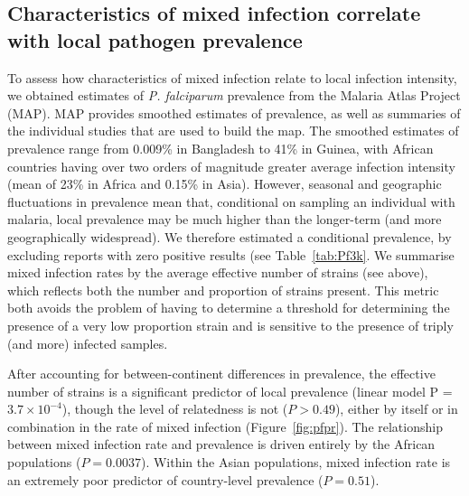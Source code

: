 \documentclass[9pt,lineno]{elife}
\begin{document}
\subsection{Characteristics of mixed infection correlate with local pathogen prevalence}


To assess how characteristics of mixed infection relate to local infection intensity, we obtained estimates of {\it P. falciparum} prevalence from the Malaria Atlas Project (MAP).  MAP provides smoothed estimates of prevalence, as well as summaries of the individual studies that are used to build the map. The smoothed estimates of prevalence  range from 0.009\% in Bangladesh to 41\% in Guinea, with African countries having over two orders of magnitude greater average infection intensity (mean of 23\% in Africa and 0.15\% in Asia). However, seasonal and geographic fluctuations in prevalence mean that, conditional on sampling an individual with malaria, local prevalence may be much higher than the longer-term (and more geographically widespread).  We therefore estimated a conditional prevalence, by excluding reports with zero positive results (see Table~\ref{tab:Pf3k}.
 We summarise mixed infection rates by the average effective number of strains (see above), which reflects both the number and proportion of strains present.  This metric both avoids the problem of having to determine a threshold for determining the presence of a very low proportion strain and is sensitive to the presence of triply (and more) infected samples.

After accounting for between-continent differences in prevalence, the effective number of strains is a significant predictor of local prevalence (linear model P = $3.7 \times 10^{-4}$), though the level of relatedness is not ($P>0.49$), either by itself or in combination in the rate of mixed infection (Figure~\ref{fig:pfpr}).  The relationship between mixed infection rate and prevalence is driven entirely by the African populations ($P = 0.0037$).  Within the Asian populations, mixed infection rate is an extremely poor predictor of country-level prevalence ($P = 0.51$).
\end{document}
